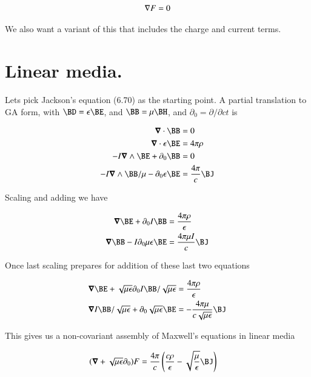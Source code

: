 \begin{align}\label{eqn:covariantMedia:foo3}
\nabla F = 0
\end{align}

We also want a variant of this that includes the charge and current terms.

\section{Linear media.}

Lets pick Jackson's equation (6.70) as the starting point.  A partial translation to GA form, with $\BD = \epsilon \BE$, and $\BB = \mu \BH$, and $\partial_0 = \partial/\partial ct$ is

\begin{align}\label{eqn:covariantMedia:foo4}
\spacegrad \cdot \BB &= 0 \\
\spacegrad \cdot \epsilon \BE &= 4 \pi \rho \\
-I \spacegrad \wedge \BE + \partial_0 \BB &= 0 \\
-I \spacegrad \wedge \BB/\mu - \partial_0 \epsilon \BE &= \frac{4 \pi}{c} \BJ
\end{align}

Scaling and adding we have

\begin{align}\label{eqn:covariantMedia:foo5}
\spacegrad \BE + \partial_0 I \BB &= \frac{4 \pi \rho}{\epsilon} \\
\spacegrad \BB - I \partial_0 \mu \epsilon \BE &= \frac{4 \pi \mu I}{c} \BJ
\end{align}

Once last scaling prepares for addition of these last two equations

\begin{align}\label{eqn:covariantMedia:foo6}
\spacegrad \BE + \sqrt{\mu\epsilon}\partial_0 I \BB/\sqrt{\mu\epsilon} &= \frac{4 \pi \rho}{\epsilon} \\
\spacegrad I \BB/\sqrt{\mu\epsilon} + \partial_0 \sqrt{\mu \epsilon} \BE &= -\frac{4 \pi \mu }{c\sqrt{\mu\epsilon}}\BJ
\end{align}

This gives us a non-covariant assembly of Maxwell's equations in linear media

\begin{align}\label{eqn:covariantMedia:foo7}
(\spacegrad + \sqrt{\mu\epsilon}\partial_0) F &= \frac{4 \pi}{c} \left( \frac{c \rho}{\epsilon} - \sqrt{\frac{\mu}{\epsilon}} \BJ \right)
\end{align}

